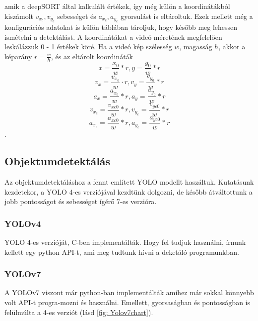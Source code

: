 \documentclass[acmtog, authorversion]{acmart}
\begin{document}
amik a deepSORT által kalkulált értékek, így még külön a koordinátákból kiszámolt \begin{math}v_{x_c},v_{y_c}\end{math} sebességet és
\begin{math}a_{x_c},a_{y_c}\end{math} gyorsulást is eltároltuk.
Ezek mellett még a konfigurációs adatokat is külön táblában tároljuk, hogy később meg lehessen ismételni a detektálást. 
A koordinátákat a videó méretének megfelelően leskálázzuk 0 - 1 értékek köré. Ha a videó kép szélesség \begin{math}w\end{math}, magasság \begin{math}h\end{math}, 
akkor a képarány \begin{math}r = \frac{w}{h}\end{math}, és az eltárolt koordináták 
\begin{equation}x = \frac{x_0}{w} * r, y = \frac{y_0}{w} * r\end{equation}
\begin{equation}v_x = \frac{v_{x_0}}{w} \cdot r, v_y = \frac{v_{y_0}}{w} * r\end{equation}
\begin{equation}a_x = \frac{a_{x_0}}{w} * r, a_y = \frac{a_{y_0}}{w} * r\end{equation}
\begin{equation}v_{x_c} = \frac{v_{xc0}}{w} * r, v_{y_c} = \frac{v_{yc0}}{w} * r\end{equation}
\begin{equation}a_{x_c} = \frac{a_{xc0}}{w} * r, a_{y_c} = \frac{a_{yc0}}{w} * r\end{equation}.
\subsection{Objektumdetektálás}
Az objektumdetektáláshoz a fennt említett YOLO modellt haszáltuk. Kutatásunk kezdetekor, a YOLO 4-es verziójával kezdtünk dolgozni,
de később átváltottunk a jobb pontosságot és sebességet ígérő 7-es verzióra.
\subsubsection{YOLOv4}
YOLO 4-es verzióját, C-ben implementálták. Hogy fel tudjuk használni, írnunk kellett egy python API-t, ami meg tudtunk hívni a
deketáló programunkban.
\subsubsection{YOLOv7}
A YOLOv7 viszont már python-ban implementálták amihez már sokkal könnyebb volt API-t progra-mozni és használni. Emellett, gyorsaságban
és pontosságban is felülmúlta a 4-es verziót (lásd \ref{fig: Yolov7chart}).
\end{document}
